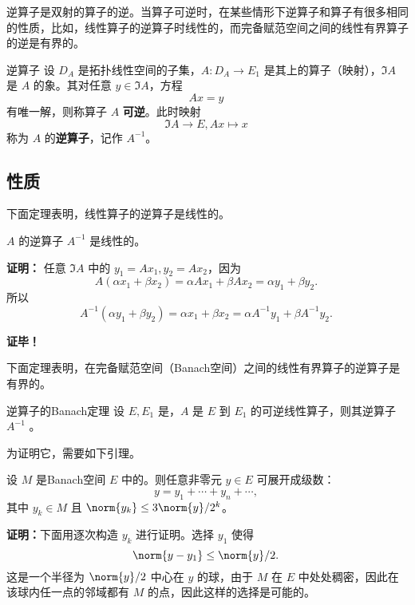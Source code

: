 

逆算子是双射的算子的逆。当算子可逆时，在某些情形下逆算子和算子有很多相同的性质，比如，线性算子的逆算子时线性的，而完备赋范空间之间的线性有界算子的逆是有界的。


\begin{definition}{逆算子}
设 $D_A$ 是拓扑线性空间的子集，$A:D_A\rightarrow E_1$ 是其上的算子（映射），$\Im A$ 是 $A$ 的象。其对任意 $y\in\Im A$，方程
\begin{equation}
Ax=y~
\end{equation}
 有唯一解，则称算子 $A$ \textbf{可逆}。此时映射
 \begin{equation}
 \Im A\rightarrow E,Ax\mapsto x~  
 \end{equation}
 称为 $A$ 的\textbf{逆算子}，记作 $A^{-1}$。

\end{definition}

\subsection{性质}
下面定理表明，线性算子的逆算子是线性的。

\begin{theorem}{}
 $A$ 的逆算子 $A^{-1}$ 是线性的。
\end{theorem}

\textbf{证明：}
任意 $\Im A$ 中的 $y_1=A x_1,y_2=Ax_2$，因为
\begin{equation}
A(\alpha x_1+\beta x_2)=\alpha Ax_1+\beta Ax_2=\alpha y_1+\beta y_2.~
\end{equation}
所以
\begin{equation}
A^{-1}(\alpha y_1+\beta y_2)=\alpha x_1+\beta x_2=\alpha A^{-1}y_1+\beta A^{-1}y_2.~
\end{equation}


\textbf{证毕！}

下面定理表明，在完备赋范空间（Banach空间）之间的线性有界算子的逆算子是有界的。

\begin{theorem}{逆算子的Banach定理}\label{the_InvOp_1}
设 $E,E_1$ 是，$A$ 是 $E$ 到 $E_1$ 的可逆线性算子，则其逆算子 $A^{-1}$ 。
\end{theorem}

为证明它，需要如下引理。
\begin{lemma}{}\label{lem_InvOp_1}
设 $M$ 是Banach空间 $E$ 中的。则任意非零元 $y\in E$ 可展开成级数：
\begin{equation}
y=y_1+\cdots+y_n+\cdots,~
\end{equation}
其中 $y_k\in M$ 且 $\norm{y_k}\leq 3\norm{y}/2^k$。
\end{lemma}
\textbf{证明：}下面用逐次构造 $y_k$ 进行证明。选择 $y_1$ 使得
\begin{equation}
\norm{y-y_1}\leq\norm{y}/2.~
\end{equation}
这是一个半径为 $\norm{y}/2$ 中心在 $y$ 的球，由于 $M$ 在 $E$ 中处处稠密，因此在该球内任一点的邻域都有 $M$ 的点，因此这样的选择是可能的。

